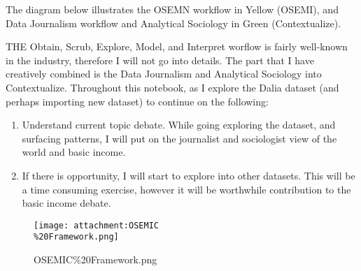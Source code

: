 \documentclass[11pt]{article}
\makeatletter
\def\maxwidth{\ifdim\Gin@nat@width>\linewidth\linewidth
    \else\Gin@nat@width\fi}
\let\Oldincludegraphics\includegraphics
\renewcommand{\includegraphics}[1]{\Oldincludegraphics[width=.8\maxwidth]{#1}}
\makeatother
\begin{document}
The diagram below illustrates the OSEMN workflow in Yellow (OSEMI), and
Data Journalism workflow and Analytical Sociology in Green
(Contextualize).

THE Obtain, Scrub, Explore, Model, and Interpret worflow is fairly
well-known in the industry, therefore I will not go into details. The
part that I have creatively combined is the Data Journalism and
Analytical Sociology into Contextualize. Throughout this notebook, as I
explore the Dalia dataset (and perhaps importing new dataset) to
continue on the following:

\begin{enumerate}
\def\labelenumi{\arabic{enumi}.}
\item
  Understand current topic debate. While going exploring the dataset,
  and surfacing patterns, I will put on the journalist and sociologist
  view of the world and basic income.
\item
  If there is opportunity, I will start to explore into other datasets.
  This will be a time consuming exercise, however it will be worthwhile
  contribution to the basic income debate.
\end{enumerate}

    \begin{figure}
\centering
\texttt{[image: attachment:OSEMIC\\\%20Framework.png]}
\caption{OSEMIC\%20Framework.png}
\end{figure}
\end{document}
